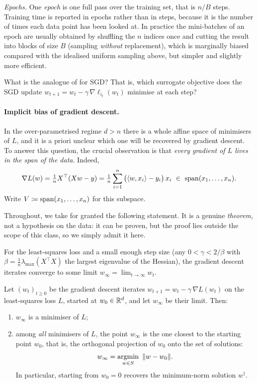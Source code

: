 \emph{Epochs.} One \emph{epoch} is one full pass over the training set, that is
$n / B$ steps. Training time is reported in epochs rather than in steps, because it is
the number of times each data point has been looked at. In practice the mini-batches
of an epoch are usually obtained by shuffling the $n$ indices once and cutting the
result into blocks of size $B$ (sampling \emph{without} replacement), which is
marginally biased compared with the idealised uniform sampling above, but simpler and
slightly more efficient.


\begin{exercise}[$\star$]
What is the analogue of  for SGD? That is, which
surrogate objective does the SGD update $w_{t+1} = w_t - \gamma\, \nabla
\ell_{i_t}(w_t)$ minimise at each step?
\end{exercise}

\paragraph{Implicit bias of gradient descent.}
In the over-parametrised regime $d > n$ there is a whole affine space of
minimisers of $L$, and it is a priori unclear which one will be recovered by gradient descent. To answer this question, the crucial observation is that \emph{every gradient of $L$ lives in
the span of the data}. Indeed,
\[
\nabla L(w) = \tfrac{1}{n} X^\top (X w - y) = \tfrac{1}{n} \sum_{i=1}^n
\big( \langle w, x_i \rangle - y_i \big)\, x_i \ \in \ \operatorname{span}(x_1, \dots, x_n).
\]
Write $V \coloneqq
\operatorname{span}(x_1, \dots, x_n)$ for this subspace.

Throughout, we take for granted the following statement. It is a genuine
\emph{theorem}, not a hypothesis on the data: it can be proven, but the proof lies outside the scope of this class, so we simply admit it here.

\begin{fact}
\label{fact:gd-converges}
For the least-squares loss and a small enough step size (any $0 < \gamma < 2/\beta$
with $\beta = \tfrac1n \lambda_{\max}(X^\top X)$ the largest eigenvalue of the
Hessian), the gradient descent iterates converge to some limit $w_\infty =
\lim_{t \to \infty} w_t$.
\end{fact}

\begin{prop}
\label{prop:implicit-bias}
Let $(w_t)_{t \geq 0}$ be the gradient descent iterates $w_{t+1} = w_t - \gamma\,
\nabla L(w_t)$ on the least-squares loss $L$, started at $w_0 \in \mathbb{R}^d$, and let
$w_\infty$ be their limit. Then:
\begin{enumerate}
    \item $w_\infty$ is a minimiser of $L$;
    \item among \emph{all} minimisers of $L$, the point $w_\infty$ is the one closest
    to the starting point $w_0$, that is, the orthogonal projection of $w_0$ onto the
    set of solutions:
    \[
    w_\infty = \operatorname*{argmin}_{w \in S}\ \Vert w - w_0 \Vert .
    \]
    In particular, starting from $w_0 = 0$ recovers the minimum-norm solution
    $w^\dagger$.
\end{enumerate}
\end{prop}

